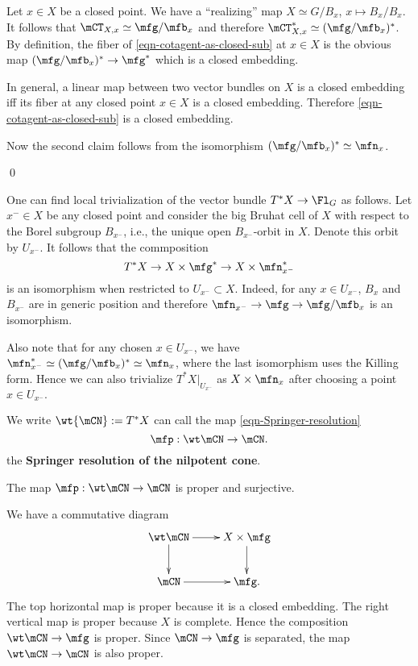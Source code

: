 	\proof
		Let $x\in X$ be a closed point. We have a ``realizing'' map $X\simeq G/B_x$, $x\mapsto B_x/B_x$. It follows that $\mCT_{X,x}\simeq \mfg/\mfb_x $ and therefore $\mCT^*_{X,x}\simeq (\mfg/\mfb_x)^* $. By definition, the fiber of \eqref{eqn-cotagent-as-closed-sub} at $x\in X$ is the obvious map $(\mfg/\mfb_x )^* \to \mfg^*$ which is a closed embedding.

		In general, a linear map between two vector bundles on $X$ is a closed embedding iff its fiber at any closed point $x\in X$ is a closed embedding. Therefore \eqref{eqn-cotagent-as-closed-sub} is a closed embedding.

		Now the second claim follows from the isomorphism $(\mfg/\mfb_x)^*\simeq \mfn_x$.

	\qed

	\begin{rem}
		\label{rem-Springer-coordinate}
		One can find local trivialization of the vector bundle $T^*X \to \Fl_G$ as follows. Let $x^-\in X$ be any closed point and consider the big Bruhat cell of $X$ with respect to the Borel subgroup $B_{x^-}$, i.e., the unique open $B_{x^-}$-orbit in $X$. Denote this orbit by $U_{x^-}$. It follows that the commposition
		\[
			T^* X \to X\mt \mfg^* \to X \mt \mfn_{x^-}^*
		\]
		is an isomorphism when restricted to $U_{x^-} \subset X$. Indeed, for any $x\in U_{x^-}$, $B_x$ and $B_{x^-}$ are in generic position and therefore $\mfn_{x^-} \to \mfg \to \mfg/\mfb_x$ is an isomorphism.

		Also note that for any chosen $x\in U_{x^-}$, we have $\mfn_{x^-}^* \simeq (\mfg/\mfb_x)^* \simeq \mfn_x$, where the last isomorphism uses the Killing form. Hence we can also trivialize $T^*X|_{U_{x^-}}$ as $X\mt \mfn_x$ after choosing a point $x\in U_{x^-}.$
	\end{rem}

	\begin{defn}
		We write $\wt{\mCN}:=T^* X $ can call the map \eqref{eqn-Springer-resolution}
		\[
			\mfp: \wt\mCN \to \mCN.
		\]	
		the \textbf{Springer resolution of the nilpotent cone}.
	\end{defn}

	\begin{lem}
		\label{lem-Springer-proper-surj}
		The map $\mfp:\wt\mCN \to \mCN$ is proper and surjective.
	\end{lem}

	\proof
		We have a commutative diagram
		\[
			\xymatrix{
				\wt\mCN \ar[r]\ar[d] & X\mt \mfg \ar[d] \\
				\mCN \ar[r] & \mfg.
			}
		\]
		The top horizontal map is proper because it is a closed embedding. The right vertical map is proper because $X$ is complete. Hence the composition $\wt\mCN\to \mfg$ is proper. Since $\mCN \to \mfg$ is separated, the map $\wt\mCN \to \mCN$ is also proper.

